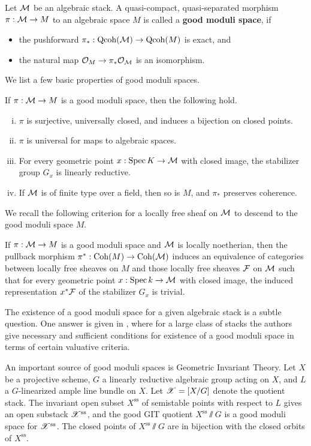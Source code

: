 Let $\mathcal{M}$ be an algebraic stack. A quasi-compact, quasi-separated morphism $\pi: \mathcal{M} \to M$ to an algebraic space $M$ is called a {\bf good moduli space}, if 
\begin{itemize}
    \item the pushforward $\pi_*: \operatorname{\mathrm{Qcoh}}(\mathcal{M}) \to \operatorname{\mathrm{Qcoh}}(M)$ is exact, and
    \item the natural map $\mathcal{O}_M \to \pi_*\mathcal{O}_{\mathcal{M}}$ is an isomorphism.
\end{itemize}
We list a few basic properties of good moduli spaces.
\begin{prop}
    If $\pi: \mathcal{M} \to M$ is a good moduli space, then the following hold. \begin{enumerate}[(i)]
        \item $\pi$ is surjective, universally closed, and induces a bijection on closed points.
        \item $\pi$ is universal for maps to algebraic spaces.
        \item For every geometric point $x: \operatorname{\mathrm{Spec}} K \to \mathcal{M}$ with closed image, the stabilizer group $G_x$ is linearly reductive.
        \item If $\mathcal{M}$ is of finite type over a field, then so is $M$, and $\pi_*$ preserves coherence.
    \end{enumerate}
\end{prop}

We recall the following criterion \cite[Theorem 10.3]{AlperGMS} for a locally free sheaf on $\mathcal{M}$ to descend to the good moduli space $M$. 
\begin{prop}\label{vbtogms}
    If $\pi: \mathcal{M} \to M$ is a good moduli space and $\mathcal{M}$ is locally noetherian, then the pullback morphism $\pi^*: \operatorname{\mathrm{Coh}}(M) \to \operatorname{\mathrm{Coh}}(\mathcal{M})$ induces an equivalence of categories between locally free sheaves on $M$ and those locally free sheaves $\mathcal{F}$ on $\mathcal{M}$ such that for every geometric point $x: \operatorname{\mathrm{Spec}} k \to \mathcal{M}$ with closed image, the induced representation $x^*\mathcal{F}$ of the stabilizer $G_x$ is trivial.
\end{prop}

The existence of a good moduli space for a given algebraic stack is a subtle question. One answer is given in \cite{AHLH}, where for a large class of stacks the authors give necessary and sufficient conditions for existence of a good moduli space in terms of certain valuative criteria.

An important source of good moduli spaces is Geometric Invariant Theory. Let $X$ be a projective scheme, $G$ a linearly reductive algebraic group acting on $X$, and $L$ a $G$-linearized ample line bundle on $X$. Let $\mathscr{X} = [X/G]$ denote the quotient stack. The invariant open subset $X^{\text{ss}}$ of semistable points with respect to $L$ gives an open substack $\mathscr{X}^{\text{ss}}$, and the good GIT quotient $X^{\text{ss}}\sslash G$ is a good moduli space for $\mathscr{X}^{\text{ss}}$. The closed points of $X^{\text{ss}}\sslash G$ are in bijection with the closed orbits of $X^{\text{ss}}$.

